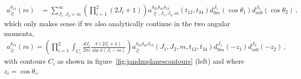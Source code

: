 \begin{align}
  a_{\gtrless}^{\delta_{13}}(m) & = \sum_{J_1,J_2=m}^{\infty} \left(\prod_{i=1}^{2} (2 J_i+1)\right) a_{\gtrless,J_1,J_2,m}^{\delta_{25}\delta_{45}\delta_{13}}(t_{12},t_{34}) d_{0 m}^{J_1}(\cos\theta_1)d_{m 0}^{J_2}(\cos\theta_2)\,,
\end{align}
which only makes sense if we also analytically continue in the two angular momenta,
\begin{align}
   a_{\gtrless}^{\delta_{13}}(m)=\left(\prod_{i=1}^{2}\int_{C_i} \frac{dJ_i}{2\pi i} \frac{\pi(2 J_i+1)}{\sin \pi(J_i-m)}\right) a_{\gtrless}^{\delta_{25}\delta_{45}\delta_{13}}(J_1,J_2, m,t_{12},t_{34}) d_{0 m}^{J_1}(-z_1)d_{m 0}^{J_2}(-z_2)\,,
\end{align}
with contours $C_i$ as shown in figure~\ref{fig:jandmplanescontours} (left) and where $z_i=\cos\theta_i$.
